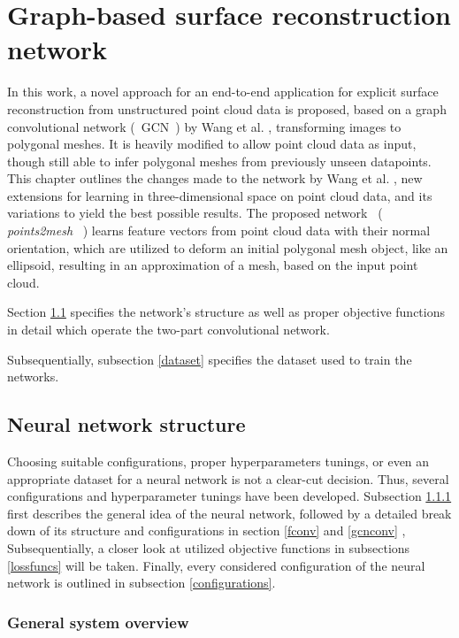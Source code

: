 \chapter{Graph-based surface reconstruction network}
\label{sec:methods}
In this work, a novel approach for an end-to-end application for explicit surface 
reconstruction from unstructured point cloud data is proposed, based on a graph convolutional network (~GCN~) by Wang et al. \cite{wang2018pixel2mesh}, transforming images 
to polygonal meshes. It is heavily modified to allow point cloud data as input, though still able to infer polygonal meshes from previously unseen datapoints. 
This chapter outlines the changes made to the network by Wang et al. , new extensions 
for learning in three-dimensional space on point cloud data, and its variations to
 yield the best possible results. 
The proposed network ~(~ \emph{points2mesh} ~) learns feature vectors from point cloud data with their
 normal orientation, which are utilized to deform an initial polygonal 
 mesh object, like an ellipsoid, resulting in an approximation of a mesh, based on the input point cloud.

Section \ref{networkconfig} specifies the network's structure as well as
 proper objective functions in detail which operate the two-part
  convolutional network.

Subsequentially, subsection \ref{dataset} specifies the dataset used to
 train the networks.

\section{Neural network structure}
\label{networkconfig}
Choosing suitable configurations, proper hyperparameters tunings,
 or even an appropriate dataset for a neural network is not a clear-cut decision. 
 Thus, several configurations and hyperparameter tunings have been developed.
  Subsection \ref{generalsystem} first describes the general idea of the neural network, followed by a detailed
   break down of its structure and configurations in section \ref{fconv} and \ref{gcnconv} ,
   Subsequentially, a closer look at utilized objective functions in subsections \ref{lossfuncs} will be taken.
   Finally, every considered configuration of the neural network is outlined in subsection \ref{configurations}.
\subsection{General system overview}
\label{generalsystem}

